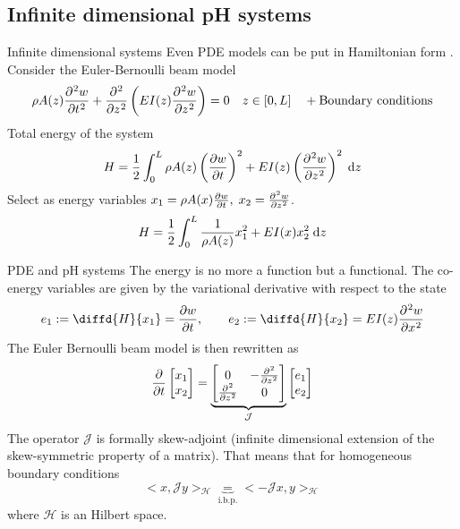 \documentclass[aspectratio=169]{ISAE-Beamer}
\begin{document}
\subsection{Infinite dimensional pH systems}

\begin{frame}{Infinite dimensional systems}
Even PDE models can be put in Hamiltonian form . Consider the Euler-Bernoulli beam model
\begin{equation*}
\rho A(z) \diffp[2]{w}{t} + \diffp[2]{}{z} \left(EI(z) \diffp[2]{w}{z} \right) =0 \quad z \in [0, L] \quad + \text{Boundary conditions}
\end{equation*}
Total energy of the system
\begin{equation*}
H = \frac{1}{2} \int_{0}^{L} \rho A(z) \left(\diffp{w}{t} \right)^2 +  EI(z) \left(\diffp[2]{w}{z} \right)^2 \d{z}
\end{equation*}
Select as energy variables $x_1 = \rho A(x) \diffp{w}{t}, \; x_2 = \diffp[2]{w}{z}$. \begin{equation*}
H = \frac{1}{2} \int_{0}^{L} \frac{1}{\rho A(z)} x_1^2 +  EI(x) x_2^2 \d{z}
\end{equation*}
\end{frame}

\begin{frame}{PDE and pH systems}
The energy is no more a function but a functional. The co-energy variables are given by the variational derivative with respect to the state
\begin{equation*}
e_1 := \diffd{H}{x_1} = \diffp{w}{t}, \qquad e_2 := \diffd{H}{x_2} = EI(z) \diffp[2]{w}{x}
\end{equation*}
The Euler Bernoulli beam model is then rewritten as
\begin{equation*}
\diffp{}{t} \begin{bmatrix}
x_1 \\ x_2 \\
\end{bmatrix} = 
\underbrace{\begin{bmatrix}
0 & -\diffp[2]{}{z} \\
\diffp[2]{}{z} & 0 \\
\end{bmatrix}}_{\mathcal{J}}
\begin{bmatrix}
e_1 \\
e_2 \\
\end{bmatrix}
\end{equation*}
The operator $\mathcal{J}$ is formally skew-adjoint (infinite dimensional extension of the skew-symmetric property of a matrix). That means that for homogeneous boundary conditions
\[
<x, \mathcal{J} y >_{\mathcal{H}} \underbrace{=}_{\text{i.b.p.}} <- \mathcal{J} x, y >_{\mathcal{H}}
\]
where $\mathcal{H}$ is an Hilbert space.
\end{frame}
\end{document}
